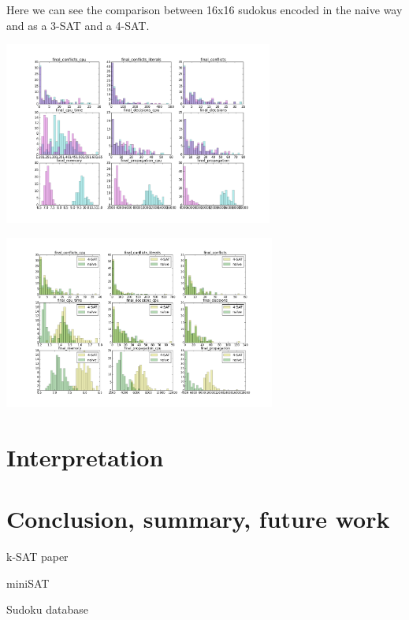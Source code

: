 \documentclass[journal, a4paper]{IEEEtran}
\begin{document}
	
Here we can see the comparison between 16x16 sudokus encoded in the naive way and as a 3-SAT and a 4-SAT.

\includegraphics[height=6cm]{16x16.png}

\includegraphics[height=5.7cm]{16x16_4SAT.png}



\section{Interpretation}




\section{Conclusion, summary, future work}
	




\begin{thebibliography}{5}

		k-SAT paper

	
		miniSAT
	
		Sudoku database


\end{thebibliography}

\end{document}
